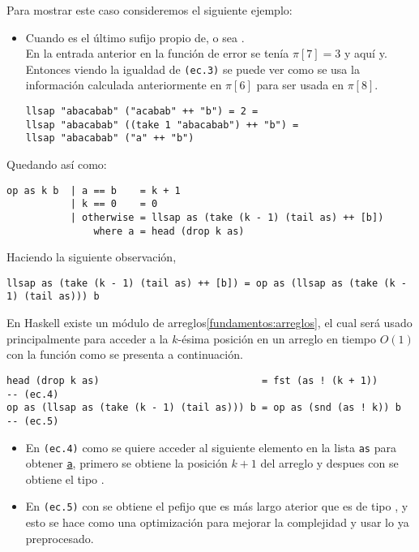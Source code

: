 Para mostrar este caso consideremos el siguiente ejemplo:
\begin{itemize}
\item Cuando es el último sufijo propio de, o sea .\\
En la entrada anterior en la función de error se tenía $\pi[7] = 3$ y aquí
y. Entonces viendo la igualdad de \texttt{(ec.3)} se puede ver como se
usa la información calculada anteriormente en $\pi[6]$ para ser usada en $\pi[8]$.
\begin{verbatim}    
llsap "abacabab" ("acabab" ++ "b") = 2 =
llsap "abacabab" ((take 1 "abacabab") ++ "b") =
llsap "abacabab" ("a" ++ "b")
\end{verbatim}
\end{itemize}

Quedando así  como:
\begin{verbatim}
op as k b  | a == b    = k + 1
           | k == 0    = 0
           | otherwise = llsap as (take (k - 1) (tail as) ++ [b])
               where a = head (drop k as)
\end{verbatim}

Haciendo la siguiente observación,
\begin{verbatim}
llsap as (take (k - 1) (tail as) ++ [b]) = op as (llsap as (take (k - 1) (tail as))) b
\end{verbatim}

En Haskell existe un módulo de arreglos\ref{fundamentos:arreglos}, el cual será usado
principalmente para acceder a la $k$-ésima posición en un arreglo en tiempo $O(1)$ con la función
\hsCode{(!)} como se presenta a continuación.

\begin{verbatim}
head (drop k as)                            = fst (as ! (k + 1))      -- (ec.4)
op as (llsap as (take (k - 1) (tail as))) b = op as (snd (as ! k)) b  -- (ec.5)
\end{verbatim}

\begin{itemize}
\item En \texttt{(ec.4)} como se quiere acceder al siguiente elemento en la lista \texttt{as} para
obtener \hyperref[funcional:func_error_a]{\texttt{a}}, primero se obtiene la posición $k+1$ del
arreglo y despues con  se obtiene el tipo .
\item En \texttt{(ec.5)} con  se obtiene el pefijo que es más largo aterior
que es de tipo , y esto se hace como una optimización para mejorar la complejidad
y usar lo ya preprocesado.
\end{itemize}

